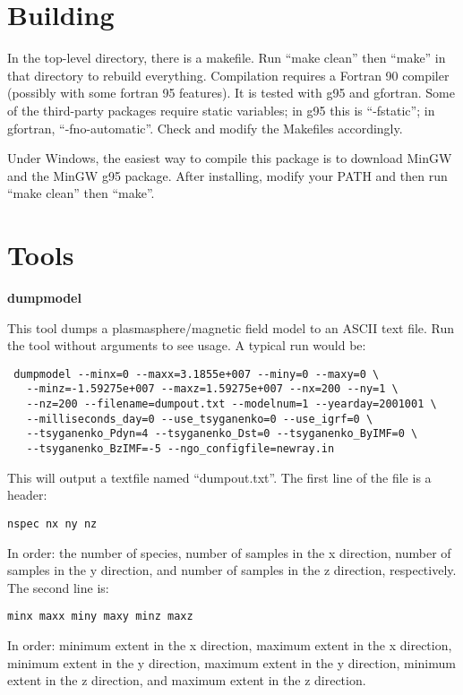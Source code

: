 \documentclass[10pt]{article}
\begin{document}
\section{Building}

In the top-level directory, there is a makefile.  Run ``make clean''
then ``make'' in that directory to rebuild everything.  Compilation
requires a Fortran 90 compiler (possibly with some fortran 95
features).  It is tested with g95 and gfortran.  Some of the
third-party packages require static variables; in g95 this is
``-fstatic''; in gfortran, ``-fno-automatic''.  Check and modify the
Makefiles accordingly.

Under Windows, the easiest way to compile this package is to download
MinGW and the MinGW g95 package.  After installing, modify your PATH
and then run ``make clean'' then ``make''.

\section{Tools}

{\bf dumpmodel}

This tool dumps a plasmasphere/magnetic field model to an ASCII text
file.  Run the tool without arguments to see usage.  A typical run
would be:
\begin{verbatim}
 dumpmodel --minx=0 --maxx=3.1855e+007 --miny=0 --maxy=0 \
   --minz=-1.59275e+007 --maxz=1.59275e+007 --nx=200 --ny=1 \
   --nz=200 --filename=dumpout.txt --modelnum=1 --yearday=2001001 \
   --milliseconds_day=0 --use_tsyganenko=0 --use_igrf=0 \
   --tsyganenko_Pdyn=4 --tsyganenko_Dst=0 --tsyganenko_ByIMF=0 \
   --tsyganenko_BzIMF=-5 --ngo_configfile=newray.in
\end{verbatim}
This will output a textfile named ``dumpout.txt''.  The first line of
the file is a header:
\begin{verbatim}
nspec nx ny nz
\end{verbatim}
In order: the number of species, number of
samples in the x direction, number of samples in the y direction,
and number of samples in the z direction, respectively.  The second
line is:
\begin{verbatim}
minx maxx miny maxy minz maxz
\end{verbatim}
In order: minimum extent in the x direction, maximum extent in the x
direction, minimum extent in the y direction, maximum extent in the y
direction, minimum extent in the z direction, and maximum extent in
the z direction.
\end{document}
